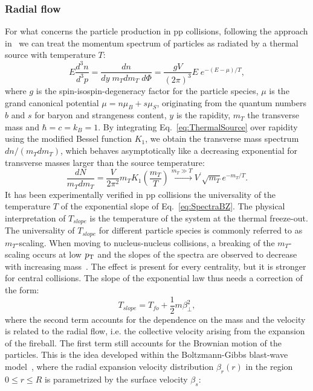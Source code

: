 \subsubsection{Radial flow}
For what concerns the particle production in pp collisions, following the approach in~\cite{Schnedermann:1993ws} we can treat the momentum spectrum of particles as radiated by a thermal source with temperature $T$:
\begin{equation}
\label{eq:ThermalSource}
E\frac{d^{3}n}{d^3p} = \frac{dn}{dy \; m_{T} dm_T\;d\Phi} = \frac{gV}{(2\pi)^3}E\;e^{-(E-\mu)/T},
\end{equation}
  where $g$ is the spin-isospin-degeneracy factor for the particle species, $\mu$ is the grand canonical potential $\mu = n\mu_{B}+ s\mu_S$, originating from the quantum numbers $b$ and $s$ for baryon and strangeness content, $y$ is the rapidity, $m_{T}$ the transverse mass and $\hbar = c = k_B = 1$. By integrating Eq.~\ref{eq:ThermalSource} over rapidity using the modified Bessel function $K_1$, we obtain the transverse mass spectrum $dn/(m_Tdm_T)$, which behaves asymptotically like a decreasing exponential for transverse masses larger than the source temperature: 
\begin{equation}
\label{eq:SpectraBZ}
\frac{dN}{m_T dm_T} = \frac{V}{2\pi^2} m_T K_1 (\frac{m_T}{T}) \xrightarrow{m_T \gg T} V^\prime \sqrt{m_T} e^{-m_T/T}.
\end{equation}
It has been experimentally verified in pp collisions the universality of the temperature $T$ of the exponential slope of Eq.~\ref{eq:SpectraBZ}. The physical interpretation of $T_{slope}$ is the temperature of the system at the thermal freeze-out. The universality of $T_{slope}$ for different particle species is commonly referred to as $m_{T}$-scaling. When moving to nucleus-nucleus collisions, a breaking of the $m_T$-scaling occurs at low $p_{\rm T}$ and the slopes of the spectra are observed to decrease with increasing mass~\cite{Appelshauser:1998yb,Arnaldi:2007ru}. The effect is present for every centrality, but it is stronger for central collisions. The slope of the exponential law thus needs a correction of the form:
\begin{equation}
\label{eq:Tslope}
T_{slope} = T_{fo} + \frac{1}{2}m \beta_{\perp}^{2},
\end{equation}
where the second term accounts for the dependence on the mass and the velocity is related to the radial flow, i.e. the collective velocity arising from the expansion of the fireball. The first term still accounts for the Brownian motion of the particles. This is the idea developed within the Boltzmann-Gibbs blast-wave model~\cite{Schnedermann:1993ws}, where the radial expansion velocity distribution $\beta_r(r)$ in the region \mbox{$0 \leq r \leq R$} is parametrized by the surface velocity $\beta_s$:
